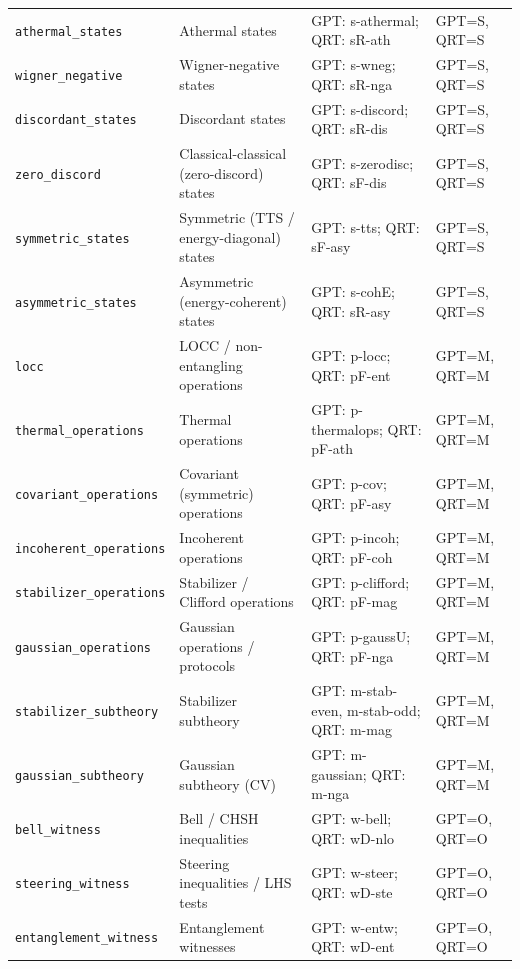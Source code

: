 \begin{longtable}{@{}p{3.1cm}p{3.6cm}p{5.0cm}p{2.9cm}@{}}
\texttt{athermal\_\allowbreak{{}}states} & Athermal states & GPT: s-athermal; QRT: sR-ath & GPT=S, QRT=S \\
\texttt{wigner\_\allowbreak{{}}negative} & Wigner-negative states & GPT: s-wneg; QRT: sR-nga & GPT=S, QRT=S \\
\texttt{discordant\_\allowbreak{{}}states} & Discordant states & GPT: s-discord; QRT: sR-dis & GPT=S, QRT=S \\
\texttt{zero\_\allowbreak{{}}discord} & Classical-classical (zero-discord) states & GPT: s-zerodisc; QRT: sF-dis & GPT=S, QRT=S \\
\texttt{symmetric\_\allowbreak{{}}states} & Symmetric (TTS / energy-diagonal) states & GPT: s-tts; QRT: sF-asy & GPT=S, QRT=S \\
\texttt{asymmetric\_\allowbreak{{}}states} & Asymmetric (energy-coherent) states & GPT: s-cohE; QRT: sR-asy & GPT=S, QRT=S \\
\texttt{locc} & LOCC / non-entangling operations & GPT: p-locc; QRT: pF-ent & GPT=M, QRT=M \\
\texttt{thermal\_\allowbreak{{}}operations} & Thermal operations & GPT: p-thermalops; QRT: pF-ath & GPT=M, QRT=M \\
\texttt{covariant\_\allowbreak{{}}operations} & Covariant (symmetric) operations & GPT: p-cov; QRT: pF-asy & GPT=M, QRT=M \\
\texttt{incoherent\_\allowbreak{{}}operations} & Incoherent operations & GPT: p-incoh; QRT: pF-coh & GPT=M, QRT=M \\
\texttt{stabilizer\_\allowbreak{{}}operations} & Stabilizer / Clifford operations & GPT: p-clifford; QRT: pF-mag & GPT=M, QRT=M \\
\texttt{gaussian\_\allowbreak{{}}operations} & Gaussian operations / protocols & GPT: p-gaussU; QRT: pF-nga & GPT=M, QRT=M \\
\texttt{stabilizer\_\allowbreak{{}}subtheory} & Stabilizer subtheory & GPT: m-stab-even, m-stab-odd; QRT: m-mag & GPT=M, QRT=M \\
\texttt{gaussian\_\allowbreak{{}}subtheory} & Gaussian subtheory (CV) & GPT: m-gaussian; QRT: m-nga & GPT=M, QRT=M \\
\texttt{bell\_\allowbreak{{}}witness} & Bell / CHSH inequalities & GPT: w-bell; QRT: wD-nlo & GPT=O, QRT=O \\
\texttt{steering\_\allowbreak{{}}witness} & Steering inequalities / LHS tests & GPT: w-steer; QRT: wD-ste & GPT=O, QRT=O \\
\texttt{entanglement\_\allowbreak{{}}witness} & Entanglement witnesses & GPT: w-entw; QRT: wD-ent & GPT=O, QRT=O \\

\end{longtable}

